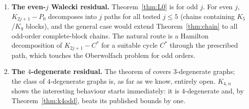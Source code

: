 \begin{enumerate}[label=\textbf{O\arabic*.},leftmargin=2.4em]
scheme of Lemma~\ref{lem:T1} meets its true wall (Remark~\ref{rem:T1scope}); the
computational record shows the wall is an artefact of the method, not of $K$. What is needed
is a construction that produces a $\ceil{n/2}$-decomposition with $D(x)\ge2$ directly,
without deleting $x$.
\item \textbf{The even-$j$ Walecki residual.} Theorem~\ref{thm:L0} is for odd $j$. For even
$j$, $K_{2j+1}-P_0$ decomposes into $j$ paths for all tested $j\le5$ (chains containing
$K_5$/$K_9$ blocks), and the general case would extend Theorem~\ref{thm:chain} to all
odd-order complete-block chains. The natural route is a Hamilton decomposition of
$K_{2j+1}-C^*$ for a suitable cycle $C^*$ through the prescribed path, which touches the
Oberwolfach problem for odd orders.
\item \textbf{The $4$-degenerate residual.} The theorem of \cite{ZLH24} covers
$3$-degenerate graphs; the class of $4$-degenerate graphs is, as far as we know, entirely
open. $K_{4,n}$ shows the interesting behaviour starts immediately: it is $4$-degenerate and,
by Theorem~\ref{thm:k4odd}, beats its published bounds by one.
\end{enumerate}


